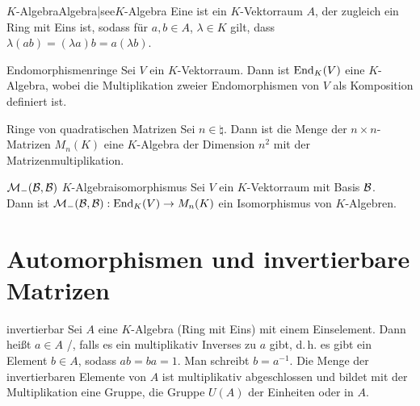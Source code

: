 
\begin{xDef}{$K$-Algebra}{Algebra|see{$K$-Algebra}}
    Eine  ist ein $K$-Vektorraum
    $A$, der zugleich ein Ring mit Eins ist,
    sodass für $a, b \in A$, $\lambda \in K$
    gilt, dass $\lambda (ab) = (\lambda a) b = a (\lambda b)$.
\end{xDef}

\begin{Satz}{Endomorphismenringe}
    Sei $V$ ein $K$-Vektorraum.
    Dann ist $\operatorname{End}_K(V)$ eine $K$-Algebra, wobei die Multiplikation zweier
    Endomorphismen von $V$ als Komposition definiert ist.
\end{Satz}

\begin{Satz}{Ringe von quadratischen Matrizen}
    Sei $n \in \natural$.
    Dann ist die Menge der $n \times n$-Matrizen $M_n(K)$ eine $K$-Algebra
    der Dimension $n^2$ mit der Matrizenmultiplikation.
\end{Satz}

\begin{Satz}{$\mathcal{M}_{-}(\mathcal{B},\mathcal{B})$ $K$-Algebraisomorphismus}
    Sei $V$ ein $K$-Vektorraum mit Basis $\mathcal{B}$. \\
    Dann ist $\mathcal{M}_{-}(\mathcal{B},\mathcal{B}): \operatorname{End}_K(V) \rightarrow M_n(K)$
    ein Isomorphismus von $K$-Algebren.
\end{Satz}

\section{%
    Automorphismen und invertierbare Matrizen%
}

\begin{Def}{invertierbar}
    Sei $A$ eine $K$-Algebra (Ring mit Eins) mit einem Einselement.
    Dann heißt $a \in A$ /, falls es
    ein multiplikativ Inverses zu $a$ gibt, d.\,h. es gibt ein Element
    $b \in A$, sodass $ab = ba = 1$.
    Man schreibt $b = a^{-1}$.
    Die Menge der invertierbaren Elemente von $A$ ist multiplikativ
    abgeschlossen und bildet mit der Multiplikation eine Gruppe, die Gruppe
    $U(A)$ der Einheiten oder  in $A$.
\end{Def}

